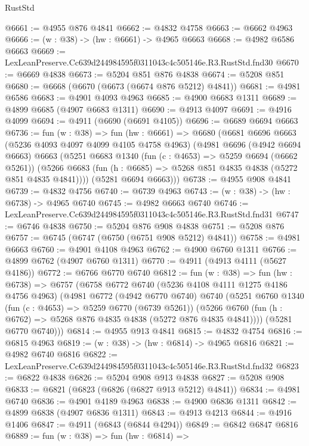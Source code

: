 \begin{lexlean}{RustStd}
\begin{coremodule}
@6661 := @4955 @876 @4841
@6662 := @4832 @4758
@6663 := @6662 @4963
@6666 := (w : @38) -> (hw : @6661) -> @4965 @6663
@6668 := @4982 @6586 @6663
@6669 := LexLeanPreserve.Cc639d244984595f0311043c4c505146e.R3.RustStd.fnd30
@6670 := @6669 @4838
@6673 := @5204 @851 @876 @4838
@6674 := @5208 @851
@6680 := @6668 (@6670 (@6673 (@6674 @876 @5212) @4841))
@6681 := @4981 @6586
@6683 := @4901 @4093 @4963
@6685 := @4900 @6683 @1311
@6689 := @4899 @6685 (@4907 @6683 @1311)
@6690 := @4913 @4097
@6691 := @4916 @4099
@6694 := @4911 (@6690 (@6691 @4105))
@6696 := @6689 @6694 @6663
@6736 := fun (w : @38) =>
  fun (hw : @6661) =>
  @6680
    (@6681
      @6696
      @6663
      (@5236 @4093 @4097 @4099 @4105 @4758 @4963)
      (@4981
        @6696
        (@4942 @6694 @6663)
        @6663
        (@5251
          @6683
          @1340
          (fun (c : @4653) => @5259 @6694 (@6662 @5261))
          (@5266 @6683 (fun (h : @6685) => @5268 @851 @4835 @4838 (@5272 @851 @4835 @4841))))
        (@5281 @6694 @6663)))
@6738 := @4955 @908 @4841
@6739 := @4832 @4756
@6740 := @6739 @4963
@6743 := (w : @38) -> (hw : @6738) -> @4965 @6740
@6745 := @4982 @6663 @6740
@6746 := LexLeanPreserve.Cc639d244984595f0311043c4c505146e.R3.RustStd.fnd31
@6747 := @6746 @4838
@6750 := @5204 @876 @908 @4838
@6751 := @5208 @876
@6757 := @6745 (@6747 (@6750 (@6751 @908 @5212) @4841))
@6758 := @4981 @6663
@6760 := @4901 @4108 @4963
@6762 := @4900 @6760 @1311
@6766 := @4899 @6762 (@4907 @6760 @1311)
@6770 := @4911 (@4913 @4111 (@5627 @4186))
@6772 := @6766 @6770 @6740
@6812 := fun (w : @38) =>
  fun (hw : @6738) =>
  @6757
    (@6758
      @6772
      @6740
      (@5236 @4108 @4111 @1275 @4186 @4756 @4963)
      (@4981
        @6772
        (@4942 @6770 @6740)
        @6740
        (@5251
          @6760
          @1340
          (fun (c : @4653) => @5259 @6770 (@6739 @5261))
          (@5266 @6760 (fun (h : @6762) => @5268 @876 @4835 @4838 (@5272 @876 @4835 @4841))))
        (@5281 @6770 @6740)))
@6814 := @4955 @913 @4841
@6815 := @4832 @4754
@6816 := @6815 @4963
@6819 := (w : @38) -> (hw : @6814) -> @4965 @6816
@6821 := @4982 @6740 @6816
@6822 := LexLeanPreserve.Cc639d244984595f0311043c4c505146e.R3.RustStd.fnd32
@6823 := @6822 @4838
@6826 := @5204 @908 @913 @4838
@6827 := @5208 @908
@6833 := @6821 (@6823 (@6826 (@6827 @913 @5212) @4841))
@6834 := @4981 @6740
@6836 := @4901 @4189 @4963
@6838 := @4900 @6836 @1311
@6842 := @4899 @6838 (@4907 @6836 @1311)
@6843 := @4913 @4213
@6844 := @4916 @1406
@6847 := @4911 (@6843 (@6844 @4294))
@6849 := @6842 @6847 @6816
@6889 := fun (w : @38) =>
  fun (hw : @6814) =>

\end{coremodule}
\end{lexlean}
